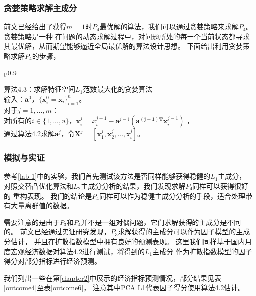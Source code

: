 \subsubsection{贪婪策略求解主成分}
前文已经给出了获得$m = 1$时$P_4$最优解的算法，我们可以通过贪婪策略来求解$P_4$。贪婪策略是一种
在问题的动态求解过程中，对问题所处的每一个当前状态都寻求其最优解，从而期望能够逼近全局最优解的算法设计思想。
下面给出利用贪婪策略求解$P_4$的步骤，
\begin{table}[H]%
    \centering%
    \begin{tabular}{{p{0.9\columnwidth}}}%
    
    \toprule%
    算法4.3：求解特征空间$L_1$范数最大化的贪婪算法\\
    \midrule%
        输入：$\bm a^0$，$\{\bm x_i^0 = \bm x_i\}_{i=1}^n$。\\
        对于$j = 1, ..., m$： \\
        对所有的$i \in \{ 1, ..., n\}$，$\bm x_i^j = x_i^{j-1} - \bm a^{j-1}(\bm {a^{(j-1)T}}\bm x_i^{j-1})$ ， \\
        通过算法4.2求解$\bm a^j$，令$\bm{X}^j = [\bm x_1^j, \bm x_2^j, ..., \bm x_i^j]$。 \\
    \bottomrule%
    \end{tabular}
\end{table}%

\subsubsection{模拟与实证}
参考\ref{lab-1}中的实验，我们首先测试该方法是否同样能够获得稳健的$L_1$主成分，
对照交替凸优化算法和$L_2$主成分分析的结果，我们发现求解$P_4$同样可以获得很好的
重构表现。
我们的结论是$P_4$同样可以作为稳健主成分分析的手段，适合处理带有大量离群值的数据。

需要注意的是由于$P_3$和$P_4$并不是一组对偶问题，它们求解获得的主成分是不同的。
前文已经通过实证研究发现，$P_3$求解获得的主成分可以作为因子模型的主成分估计，
并且在扩散指数模型中拥有良好的预测表现。
这里我们同样基于国内月度宏观经济数据对算法4.2进行测试，将得到的$L_1$主成分
作为扩散指数模型的因子得分对部分指标进行经济预测。

我们列出一些在第\ref{chapter2}中展示的经济指标预测情况，部分结果见表\ref{outcome4}至表\ref{outcome6}，
注意其中PCA L1代表因子得分使用算法4.2估计。

